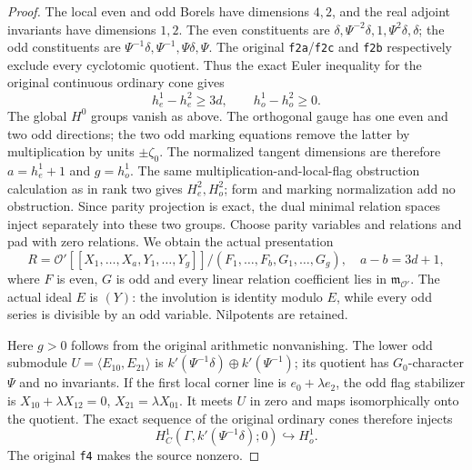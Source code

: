 \begin{proof}
The local even and odd Borels have dimensions $4,2$, and the real
adjoint invariants have dimensions $1,2$.  The even constituents are
$\delta,\Psi^{-2}\delta,1,\Psi^2\delta,\delta$; the odd constituents
are $\Psi^{-1}\delta,\Psi^{-1},\Psi\delta,\Psi$.
The original \texttt{f2a}/\texttt{f2c} and \texttt{f2b} respectively
exclude every cyclotomic quotient.  Thus the exact Euler inequality
for the original continuous ordinary cone gives
\begin{equation}\label{eq:rankthree-parity-euler}
 h^1_e-h^2_e\ge3d,\qquad h^1_o-h^2_o\ge0.
\end{equation}
The global $H^0$ groups vanish as above.  The orthogonal gauge has
one even and two odd directions; the two odd marking equations
remove the latter by multiplication by units $\pm\zeta_0$.
The normalized tangent dimensions are therefore $a=h^1_e+1$ and
$g=h^1_o$.  The same multiplication-and-local-flag obstruction
calculation as in rank two gives $H^2_e,H^2_o$; form and marking
normalization add no obstruction.  Since parity projection is exact,
the dual minimal relation spaces inject separately into these two
groups.  Choose parity variables and relations and pad with zero
relations.  We obtain the actual presentation
\begin{equation}\label{eq:rankthree-parity-presentation}
 R=\mathcal O'[[X_1,\ldots,X_a,Y_1,\ldots,Y_g]]/(F_1,\ldots,F_b,G_1,\ldots,G_g),
 \quad a-b=3d+1,
\end{equation}
where $F$ is even, $G$ is odd and every linear relation coefficient
lies in $\mathfrak m_{\mathcal O'}$.  The actual ideal $E$ is $(Y)$:
the involution is identity modulo $E$, while every odd series is
divisible by an odd variable.  Nilpotents are retained.

Here $g>0$ follows from the original arithmetic nonvanishing.
The lower odd submodule $U=\langle E_{10},E_{21}\rangle$ is
$k'(\Psi^{-1}\delta)\oplus k'(\Psi^{-1})$; its quotient has
$G_0$-character $\Psi$ and no invariants.  If the first local
corner line is $e_0+\lambda e_2$, the odd flag stabilizer is
$X_{10}+\lambda X_{12}=0$, $X_{21}=\lambda X_{01}$.
It meets $U$ in zero and maps isomorphically onto the quotient.
The exact sequence of the original ordinary cones therefore injects
\[
 H^1_C(\Gamma,k'(\Psi^{-1}\delta);0)\hookrightarrow H^1_o.
\]
The original \texttt{f4} makes the source nonzero.


\end{proof}
